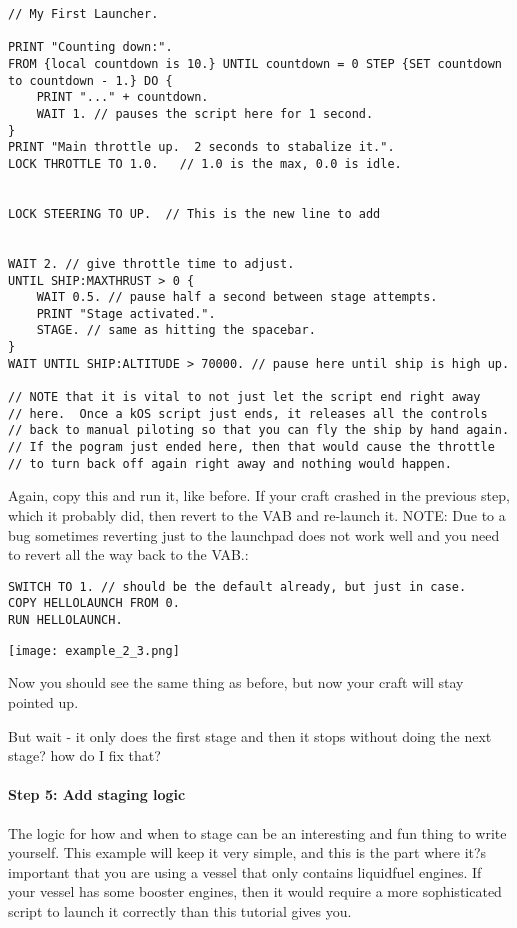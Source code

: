 \begin{Verbatim}[frame=single]
// My First Launcher.

PRINT "Counting down:".
FROM {local countdown is 10.} UNTIL countdown = 0 STEP {SET countdown to countdown - 1.} DO {
    PRINT "..." + countdown.
    WAIT 1. // pauses the script here for 1 second.
}
PRINT "Main throttle up.  2 seconds to stabalize it.".
LOCK THROTTLE TO 1.0.   // 1.0 is the max, 0.0 is idle.


LOCK STEERING TO UP.  // This is the new line to add


WAIT 2. // give throttle time to adjust.
UNTIL SHIP:MAXTHRUST > 0 {
    WAIT 0.5. // pause half a second between stage attempts.
    PRINT "Stage activated.".
    STAGE. // same as hitting the spacebar.
}
WAIT UNTIL SHIP:ALTITUDE > 70000. // pause here until ship is high up.

// NOTE that it is vital to not just let the script end right away
// here.  Once a kOS script just ends, it releases all the controls
// back to manual piloting so that you can fly the ship by hand again.
// If the pogram just ended here, then that would cause the throttle
// to turn back off again right away and nothing would happen.
\end{Verbatim} 

Again, copy this and run it, like before. If your craft crashed in the previous step, which it probably did, then revert to the VAB and re-launch it. NOTE: Due to a bug sometimes reverting just to the launchpad does not work well and you need to revert all the way back to the VAB.:

\begin{Verbatim}[frame=single]
SWITCH TO 1. // should be the default already, but just in case.
COPY HELLOLAUNCH FROM 0.
RUN HELLOLAUNCH.
\end{Verbatim} 

\begin{center}
\texttt{[image: example\_2\_3.png]}
\end{center}

Now you should see the same thing as before, but now your craft will stay pointed up.

But wait - it only does the first stage and then it stops without doing the next stage? how do I fix that?

\paragraph{Step 5: Add staging logic}
The logic for how and when to stage can be an interesting and fun thing to write yourself. This example will keep it very simple, and this is the part where it?s important that you are using a vessel that only contains liquidfuel engines. If your vessel has some booster engines, then it would require a more sophisticated script to launch it correctly than this tutorial gives you.

